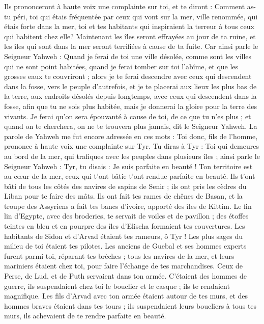 \begin{multicols}{2}
Ils prononceront à haute voix une complainte sur toi, et te diront : Comment as-tu péri, toi qui étais fréquentée par ceux qui vont sur la mer, ville renommée, qui étais forte dans la mer, toi et tes habitants qui inspiraient la terreur à tous ceux qui habitent chez elle?
Maintenant les îles seront effrayées au jour de ta ruine, et les îles qui sont dans la mer seront terrifiées à cause de ta fuite.
Car ainsi parle le Seigneur Yahweh : Quand je ferai de toi une ville désolée, comme sont les villes qui ne sont point habitées, quand je ferai  tomber sur toi l'abîme, et que les grosses eaux te couvriront ;
alors je te ferai descendre avec ceux qui descendent dans la fosse, vers le peuple d'autrefois, et je te placerai aux lieux les plus bas de la terre, aux endroits désolés depuis longtemps, avec ceux qui descendent dans la fosse, afin que tu ne sois plus habitée, mais je donnerai la gloire pour la terre des vivants.
Je ferai qu'on sera épouvanté à cause de toi, de ce que tu n'es plus ; et quand on te cherchera, on ne te trouvera plus jamais, dit le Seigneur Yahweh.
\VerseOne{}La parole de Yahweh me fut encore adressée en ces mots :
Toi donc, fils de l'homme, prononce à haute voix une complainte sur Tyr.
Tu diras à Tyr : Toi qui demeures au bord de la mer, qui trafiques avec les peuples dans plusieurs îles ; ainsi parle le Seigneur Yahweh : Tyr, tu disais : Je suis parfaite en beauté !
Ton territoire est au cœur de la mer, ceux qui t'ont bâtie t'ont rendue parfaite en beauté.
Ils t'ont bâti de tous les côtés des navires de sapins de Senir ; ils ont pris les cèdres du Liban pour te faire des mâts.
Ils ont fait tes rames de chênes de Basan, et la troupe des Assyriens a fait tes bancs d'ivoire, apporté des îles de Kittim.
Le fin lin d'Egypte, avec des broderies, te servait de voiles et de pavillon ; des étoffes teintes en bleu et en pourpre des îles d'Elischa formaient tes couvertures.
Les habitants de Sidon et d'Arvad étaient tes rameurs, ô Tyr ! Les plus sages du milieu de toi étaient tes pilotes.
Les anciens de Guebal et ses hommes experts furent parmi toi, réparant tes brèches ; tous les navires de la mer, et leurs mariniers étaient chez toi, pour faire l'échange de tes marchandises.
Ceux de Perse, de Lud, et de Puth servaient dans ton armée. C'étaient des hommes de guerre, ils suspendaient chez toi le bouclier et le casque ; ils te rendaient magnifique.
Les fils d'Arvad avec ton armée étaient autour de tes murs, et des hommes braves étaient dans tes tours ; ils suspendaient leurs boucliers à tous tes murs, ils achevaient de te rendre parfaite en beauté.

\end{multicols}
